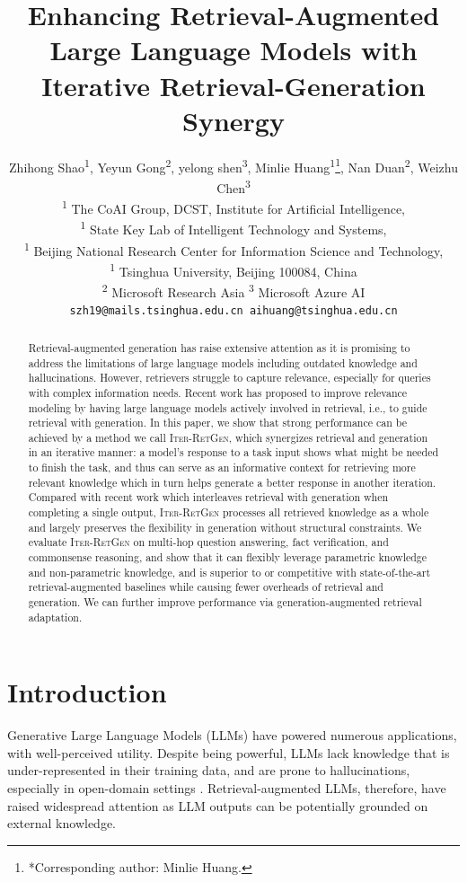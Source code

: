 \documentclass[11pt]{article}
\title{Enhancing Retrieval-Augmented Large Language Models with Iterative Retrieval-Generation Synergy}
\author{
    Zhihong Shao\textsuperscript{1}, Yeyun Gong\textsuperscript{2}, yelong shen\textsuperscript{3}, Minlie Huang\textsuperscript{1}\thanks{*Corresponding author: Minlie Huang.}, Nan Duan\textsuperscript{2}, Weizhu Chen\textsuperscript{3}\\
    \textsuperscript{1} The CoAI Group, DCST, Institute for Artificial Intelligence, \\
    \textsuperscript{1} State Key Lab of Intelligent Technology and Systems, \\
    \textsuperscript{1} Beijing National Research Center for Information Science and Technology, \\
    \textsuperscript{1} Tsinghua University, Beijing 100084, China \\
    \textsuperscript{2} Microsoft Research Asia \textsuperscript{3} Microsoft Azure AI \\
    {\tt szh19@mails.tsinghua.edu.cn aihuang@tsinghua.edu.cn}}
\begin{document}
\maketitle
\begin{abstract}
Retrieval-augmented generation has raise extensive attention as it is promising to address the limitations of large language models including outdated knowledge and hallucinations.
However, retrievers struggle to capture relevance, especially for queries with complex information needs.
Recent work has proposed to improve relevance modeling by having large language models actively involved in retrieval, i.e., to guide retrieval with generation.
In this paper, we show that strong performance can be achieved by a method we call I\textsc{ter}-R\textsc{et}G\textsc{en}, which synergizes retrieval and generation in an iterative manner:
a model's response to a task input shows what might be needed to finish the task, and thus can serve as an informative context for retrieving more relevant knowledge which in turn helps generate a better response in another iteration.
Compared with recent work which interleaves retrieval with generation when completing a single output, I\textsc{ter}-R\textsc{et}G\textsc{en} processes all retrieved knowledge as a whole and largely preserves the flexibility in generation without structural constraints.
We evaluate I\textsc{ter}-R\textsc{et}G\textsc{en} on multi-hop question answering, fact verification, and commonsense reasoning, and show that it can flexibly leverage parametric knowledge and non-parametric knowledge, and is superior to or competitive with state-of-the-art retrieval-augmented baselines while causing fewer overheads of retrieval and generation.
We can further improve performance via generation-augmented retrieval adaptation.
\end{abstract}

\section{Introduction}
Generative Large Language Models (LLMs) have powered numerous applications, with well-perceived utility.
Despite being powerful, LLMs lack knowledge that is under-represented in their training data, and are prone to hallucinations, especially in open-domain settings \cite{DBLP:journals/corr/abs-2303-08774}.
Retrieval-augmented LLMs, therefore, have raised widespread attention as LLM outputs can be potentially grounded on external knowledge.
\end{document}
